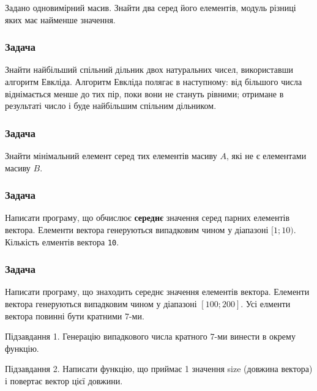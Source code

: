 \documentclass[
]{book}
\begin{document}
Задано одновимірний масив. Знайти два серед його елементів, модуль різниці яких має
найменше значення.

\hypertarget{task6117}{%
\subsubsection{Задача}\label{task6117}}

Знайти найбільший спільний дільник двох натуральних чисел, використавши алгоритм
Евкліда. Алгоритм Евкліда полягає в наступному: від більшого числа віднімається менше до тих пір,
поки вони не стануть рівними; отримане в результаті число і буде найбільшим спільним дільником.

\hypertarget{task6118}{%
\subsubsection{Задача}\label{task6118}}

Знайти мінімальний елемент серед тих елементів масиву \(A\), які не є елементами масиву \(B\).

\hypertarget{task6119}{%
\subsubsection{Задача}\label{task6119}}

Написати програму, що обчислює \textbf{середнє} значення серед парних елементів вектора. Елементи вектора генеруються випадковим чином у діапазоні \([1; 10)\). Кількість елментів вектора \texttt{10}.

\hypertarget{task6120}{%
\subsubsection{Задача}\label{task6120}}

Написати програму, що знаходить середнє значення елементів вектора. Елементи вектора генеруються випадковим чином у діапазоні \([100; 200]\). Усі елменти вектора повинні бути кратними \(7\)-ми.

Підзавдання 1. Генерацію випадкового числа кратного \(7\)-ми винести в окрему функцію.

Підзавдання 2. Написати функцію, що приймає 1 значення size (довжина вектора) і повертає вектор цієї довжини.
\end{document}
